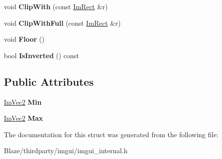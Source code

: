 \begin{DoxyCompactItemize}
\mbox{\label{structImRect_ac02d5cf6ce0358aea9ed9df43d368f3f}} 
void {\bfseries Clip\+With} (const \hyperlink{structImRect}{Im\+Rect} \&r)
\item 
\mbox{\label{structImRect_a32a5aaca4161b5ffa3f352d293a449ff}} 
void {\bfseries Clip\+With\+Full} (const \hyperlink{structImRect}{Im\+Rect} \&r)
\item 
\mbox{\label{structImRect_a8fdf75a0c64ff29f65113cd9f8be77ab}} 
void {\bfseries Floor} ()
\item 
\mbox{\label{structImRect_a140efca57832182e2483e5fe4ba50422}} 
bool {\bfseries Is\+Inverted} () const
\end{DoxyCompactItemize}
\subsection*{Public Attributes}
\begin{DoxyCompactItemize}
\item 
\mbox{\label{structImRect_af8f3fbf7ec983e03548b88e14ba68aa8}} 
\hyperlink{structImVec2}{Im\+Vec2} {\bfseries Min}
\item 
\mbox{\label{structImRect_aad58c13340d320b350a72a037e3f7628}} 
\hyperlink{structImVec2}{Im\+Vec2} {\bfseries Max}
\end{DoxyCompactItemize}


The documentation for this struct was generated from the following file\+:\begin{DoxyCompactItemize}
\item 
Blaze/thirdparty/imgui/imgui\+\_\+internal.\+h\end{DoxyCompactItemize}
